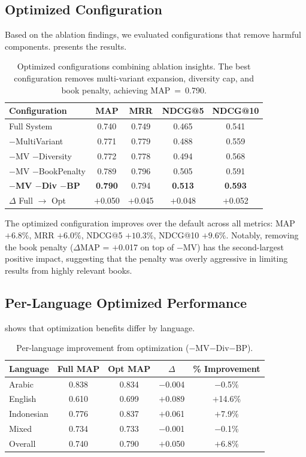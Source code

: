 \documentclass[preprint,12pt,authoryear]{elsarticle}
\begin{document}
\subsection{Optimized Configuration}

Based on the ablation findings, we evaluated configurations that remove harmful components.  presents the results.

\begin{table}[t]
\centering
\caption{Optimized configurations combining ablation insights. The best configuration removes multi-variant expansion, diversity cap, and book penalty, achieving MAP~=~0.790.}
\label{tab:optimized}
\begin{tabular}{lcccc}
\toprule
Configuration & MAP & MRR & NDCG@5 & NDCG@10 \\
\midrule
Full System & 0.740 & 0.749 & 0.465 & 0.541 \\
$-$MultiVariant & 0.771 & 0.779 & 0.488 & 0.559 \\
$-$MV $-$Diversity & 0.772 & 0.778 & 0.494 & 0.568 \\
$-$MV $-$BookPenalty & 0.789 & 0.796 & 0.505 & 0.591 \\
\textbf{$-$MV $-$Div $-$BP} & \textbf{0.790} & 0.794 & \textbf{0.513} & \textbf{0.593} \\
\midrule
$\Delta$ Full $\rightarrow$ Opt & $+$0.050 & $+$0.045 & $+$0.048 & $+$0.052 \\
\bottomrule
\end{tabular}
\end{table}

The optimized configuration improves over the default across all metrics: MAP $+6.8\%$, MRR $+6.0\%$, NDCG@5 $+10.3\%$, NDCG@10 $+9.6\%$. Notably, removing the book penalty ($\Delta$MAP = $+$0.017 on top of $-$MV) has the second-largest positive impact, suggesting that the penalty was overly aggressive in limiting results from highly relevant books.

\subsection{Per-Language Optimized Performance}

 shows that optimization benefits differ by language.

\begin{table}[t]
\centering
\caption{Per-language improvement from optimization ($-$MV$-$Div$-$BP).}
\label{tab:optimized-lang}
\begin{tabular}{lcccc}
\toprule
Language & Full MAP & Opt MAP & $\Delta$ & \% Improvement \\
\midrule
Arabic & 0.838 & 0.834 & $-$0.004 & $-$0.5\% \\
English & 0.610 & 0.699 & $+$0.089 & $+$14.6\% \\
Indonesian & 0.776 & 0.837 & $+$0.061 & $+$7.9\% \\
Mixed & 0.734 & 0.733 & $-$0.001 & $-$0.1\% \\
\midrule
Overall & 0.740 & 0.790 & $+$0.050 & $+$6.8\% \\
\bottomrule
\end{tabular}
\end{table}
\end{document}
